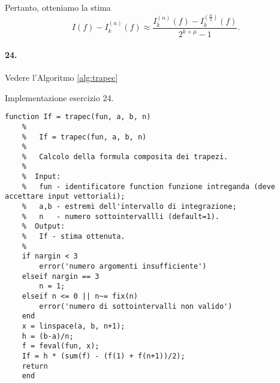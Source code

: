 \noindent Pertanto, otteniamo la stima
\begin{equation*}
    I(f)-I_k^{(n)}(f) \approx \frac{I_k^{(n)}(f)-I_k^{(\frac{n}{2})}(f)}{2^{k+\mu}-1}.
\end{equation*}

\paragraph{24.} Vedere l'Algoritmo \ref{alg:trapec}
\begin{algorithm}
\caption{Implementazione esercizio 24.}\label{alg:trapec}
    \begin{lstlisting}[style=Matlab-editor]
    function If = trapec(fun, a, b, n)
    %   
    %   If = trapec(fun, a, b, n)
    %
    %   Calcolo della formula composita dei trapezi.
    %
    %  Input:
    %   fun - identificatore function funzione intreganda (deve accettare input vettoriali);
    %   a,b - estremi dell'intervallo di integrazione;
    %   n   - numero sottointervallli (default=1).
    %  Output:
    %   If - stima ottenuta.
    %
    if nargin < 3
        error('numero argomenti insufficiente')
    elseif nargin == 3
        n = 1;
    elseif n <= 0 || n~= fix(n)
        error('numero di sottointervalli non valido')
    end
    x = linspace(a, b, n+1);
    h = (b-a)/n;
    f = feval(fun, x);
    If = h * (sum(f) - (f(1) + f(n+1))/2);
    return
    end
    \end{lstlisting}
\end{algorithm}
